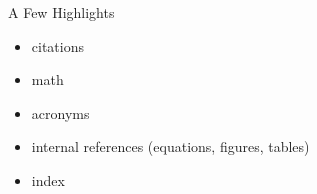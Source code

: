 \documentclass[xcolor=dvipsnames, aspectratio=169, handout, intlimits]{beamer}
\begin{document}
\begin{frame}{A Few Highlights}

\vspace{-0.5cm}

\begin{itemize}
	\item citations
	\item math
	\item acronyms
	\item internal references (equations, figures, tables)
	\item index
\end{itemize}

\end{frame}

\end{document}
